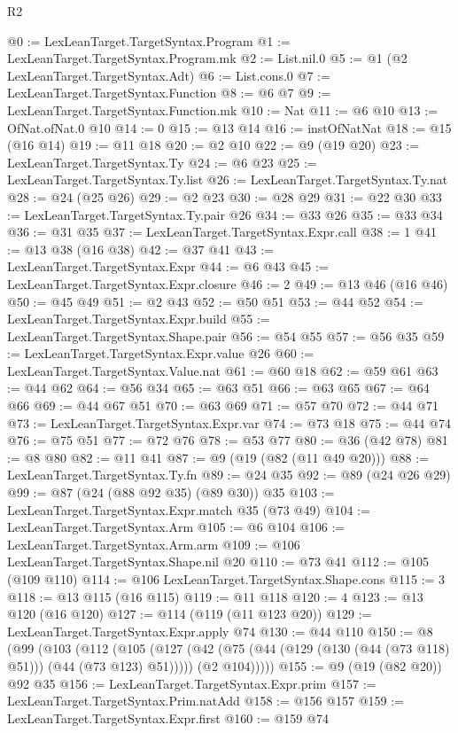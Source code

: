 \begin{lexlean}{R2}
\begin{coremodule}
@0 := LexLeanTarget.TargetSyntax.Program
@1 := LexLeanTarget.TargetSyntax.Program.mk
@2 := List.nil.{0}
@5 := @1 (@2 LexLeanTarget.TargetSyntax.Adt)
@6 := List.cons.{0}
@7 := LexLeanTarget.TargetSyntax.Function
@8 := @6 @7
@9 := LexLeanTarget.TargetSyntax.Function.mk
@10 := Nat
@11 := @6 @10
@13 := OfNat.ofNat.{0} @10
@14 := 0
@15 := @13 @14
@16 := instOfNatNat
@18 := @15 (@16 @14)
@19 := @11 @18
@20 := @2 @10
@22 := @9 (@19 @20)
@23 := LexLeanTarget.TargetSyntax.Ty
@24 := @6 @23
@25 := LexLeanTarget.TargetSyntax.Ty.list
@26 := LexLeanTarget.TargetSyntax.Ty.nat
@28 := @24 (@25 @26)
@29 := @2 @23
@30 := @28 @29
@31 := @22 @30
@33 := LexLeanTarget.TargetSyntax.Ty.pair @26
@34 := @33 @26
@35 := @33 @34
@36 := @31 @35
@37 := LexLeanTarget.TargetSyntax.Expr.call
@38 := 1
@41 := @13 @38 (@16 @38)
@42 := @37 @41
@43 := LexLeanTarget.TargetSyntax.Expr
@44 := @6 @43
@45 := LexLeanTarget.TargetSyntax.Expr.closure
@46 := 2
@49 := @13 @46 (@16 @46)
@50 := @45 @49
@51 := @2 @43
@52 := @50 @51
@53 := @44 @52
@54 := LexLeanTarget.TargetSyntax.Expr.build
@55 := LexLeanTarget.TargetSyntax.Shape.pair
@56 := @54 @55
@57 := @56 @35
@59 := LexLeanTarget.TargetSyntax.Expr.value @26
@60 := LexLeanTarget.TargetSyntax.Value.nat
@61 := @60 @18
@62 := @59 @61
@63 := @44 @62
@64 := @56 @34
@65 := @63 @51
@66 := @63 @65
@67 := @64 @66
@69 := @44 @67 @51
@70 := @63 @69
@71 := @57 @70
@72 := @44 @71
@73 := LexLeanTarget.TargetSyntax.Expr.var
@74 := @73 @18
@75 := @44 @74
@76 := @75 @51
@77 := @72 @76
@78 := @53 @77
@80 := @36 (@42 @78)
@81 := @8 @80
@82 := @11 @41
@87 := @9 (@19 (@82 (@11 @49 @20)))
@88 := LexLeanTarget.TargetSyntax.Ty.fn
@89 := @24 @35
@92 := @89 (@24 @26 @29)
@99 := @87 (@24 (@88 @92 @35) (@89 @30)) @35
@103 := LexLeanTarget.TargetSyntax.Expr.match @35 (@73 @49)
@104 := LexLeanTarget.TargetSyntax.Arm
@105 := @6 @104
@106 := LexLeanTarget.TargetSyntax.Arm.arm
@109 := @106 LexLeanTarget.TargetSyntax.Shape.nil @20
@110 := @73 @41
@112 := @105 (@109 @110)
@114 := @106 LexLeanTarget.TargetSyntax.Shape.cons
@115 := 3
@118 := @13 @115 (@16 @115)
@119 := @11 @118
@120 := 4
@123 := @13 @120 (@16 @120)
@127 := @114 (@119 (@11 @123 @20))
@129 := LexLeanTarget.TargetSyntax.Expr.apply @74
@130 := @44 @110
@150 := @8
    (@99
      (@103
        (@112
          (@105
            (@127 (@42 (@75 (@44 (@129 (@130 (@44 (@73 @118) @51))) (@44 (@73 @123) @51)))))
            (@2 @104)))))
@155 := @9 (@19 (@82 @20)) @92 @35
@156 := LexLeanTarget.TargetSyntax.Expr.prim
@157 := LexLeanTarget.TargetSyntax.Prim.natAdd
@158 := @156 @157
@159 := LexLeanTarget.TargetSyntax.Expr.first
@160 := @159 @74

\end{coremodule}
\end{lexlean}
